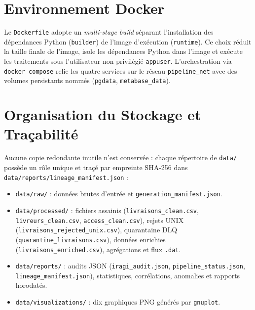 \documentclass[11pt,a4paper]{article}
\begin{document}
\section{Environnement Docker}
Le \texttt{Dockerfile} adopte un \emph{multi-stage build} s\'eparant l'installation des d\'ependances Python (\texttt{builder}) de l'image d'ex\'ecution (\texttt{runtime}). Ce choix r\'eduit la taille finale de l'image, isole les d\'ependances Python dans l'image et ex\'ecute les traitements sous l'utilisateur non privil\'egi\'e \texttt{appuser}. L'orchestration via \texttt{docker compose} relie les quatre services sur le r\'eseau \texttt{pipeline\_net} avec des volumes persistants nomm\'es (\texttt{pgdata}, \texttt{metabase\_data}).

\section{Organisation du Stockage et Tra\c{c}abilit\'e}
Aucune copie redondante inutile n'est conserv\'ee : chaque r\'epertoire de \texttt{data/} poss\`ede un r\^ole unique et tra\c{c}\'e par empreinte SHA-256 dans \texttt{data/reports/lineage\_manifest.json} :
\begin{itemize}
    \item \texttt{data/raw/} : donn\'ees brutes d'entr\'ee et \texttt{generation\_manifest.json}.
    \item \texttt{data/processed/} : fichiers assainis (\texttt{livraisons\_clean.csv}, \texttt{livreurs\_clean.csv}, \texttt{access\_clean.csv}), rejets UNIX (\texttt{livraisons\_rejected\_unix.csv}), quarantaine DLQ (\texttt{quarantine\_livraisons.csv}), donn\'ees enrichies (\texttt{livraisons\_enriched.csv}), agr\'egations et flux \texttt{.dat}.
    \item \texttt{data/reports/} : audits JSON (\texttt{iragi\_audit.json}, \texttt{pipeline\_status.json}, \texttt{lineage\_manifest.json}), statistiques, corr\'elations, anomalies et rapports horodat\'es.
    \item \texttt{data/visualizations/} : dix graphiques PNG g\'en\'er\'es par \texttt{gnuplot}.
\end{itemize}
\end{document}
